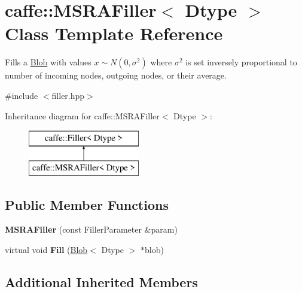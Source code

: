 \hypertarget{classcaffe_1_1MSRAFiller}{}\section{caffe\+:\+:M\+S\+R\+A\+Filler$<$ Dtype $>$ Class Template Reference}
\label{classcaffe_1_1MSRAFiller}


Fills a \hyperlink{classcaffe_1_1Blob}{Blob} with values $ x \sim N(0, \sigma^2) $ where $ \sigma^2 $ is set inversely proportional to number of incoming nodes, outgoing nodes, or their average.  




{\ttfamily \#include $<$filler.\+hpp$>$}

Inheritance diagram for caffe\+:\+:M\+S\+R\+A\+Filler$<$ Dtype $>$\+:\begin{figure}[H]
\begin{center}
\leavevmode
\includegraphics[height=2.000000cm]{classcaffe_1_1MSRAFiller}
\end{center}
\end{figure}
\subsection*{Public Member Functions}
\begin{DoxyCompactItemize}
\item 
{\bfseries M\+S\+R\+A\+Filler} (const Filler\+Parameter \&param)\hypertarget{classcaffe_1_1MSRAFiller_a68b0367c462b9cfce5379074105282c9}{}\label{classcaffe_1_1MSRAFiller_a68b0367c462b9cfce5379074105282c9}

\item 
virtual void {\bfseries Fill} (\hyperlink{classcaffe_1_1Blob}{Blob}$<$ Dtype $>$ $\ast$blob)\hypertarget{classcaffe_1_1MSRAFiller_a174e9fab9be5c0c598680bebc621ab8f}{}\label{classcaffe_1_1MSRAFiller_a174e9fab9be5c0c598680bebc621ab8f}

\end{DoxyCompactItemize}
\subsection*{Additional Inherited Members}


